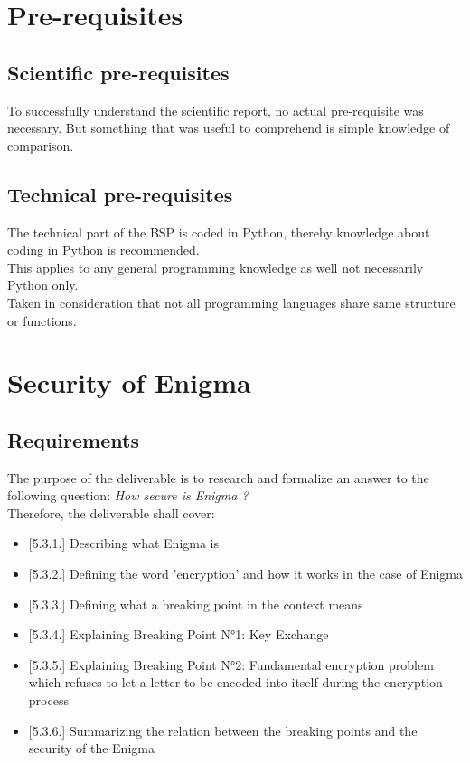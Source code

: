 \documentclass[conference,compsoc]{IEEEtran}
\begin{document}
\section{Pre-requisites}

\subsection{Scientific pre-requisites}
To successfully understand the scientific report, no actual pre-requisite was necessary.
But something that was useful to comprehend is simple knowledge of comparison.
\subsection{Technical pre-requisites}
The technical part of the BSP is coded in Python, thereby knowledge about coding in Python is recommended.\\
This applies to any general programming knowledge as well not necessarily Python only.\\
Taken in consideration that not all programming languages share same structure or functions.\\


\section{ Security of Enigma}
\label{sec-production}
\subsection{Requirements}
The purpose of the deliverable is to research and formalize an answer to the following question: \emph{How secure is Enigma ?}\\
Therefore, the deliverable shall cover:
\begin{itemize}
    \item{[5.3.1.]} Describing what Enigma is
    \item{[5.3.2.]} Defining the word 'encryption' and how it works in the case of Enigma
    \item{[5.3.3.]} Defining what a breaking point in the context means
    \item{[5.3.4.]} Explaining Breaking Point N°1: Key Exchange
    \item{[5.3.5.]} Explaining Breaking Point N°2: Fundamental encryption problem which refuses to let a letter to be encoded into itself during the encryption process
    \item{[5.3.6.]} Summarizing the relation between the breaking points and the security of the Enigma
\end{itemize}
\end{document}
